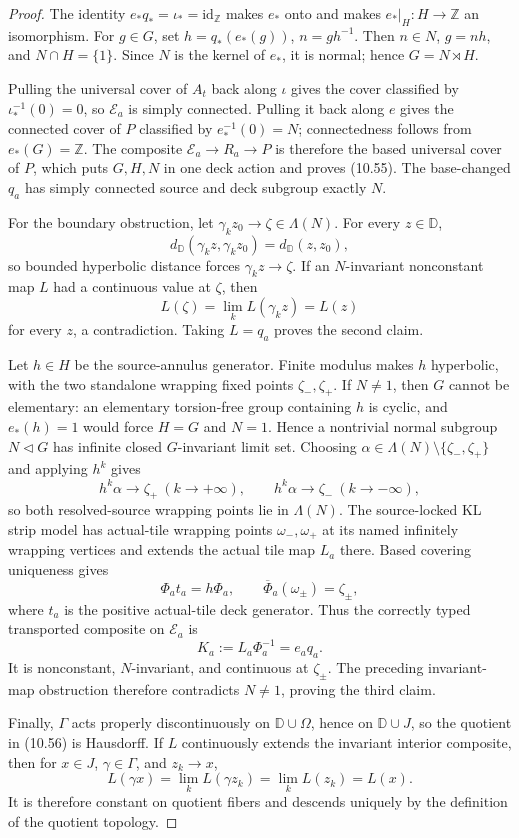 \begin{proof}
The identity \(e_*q_*=\iota_*=\mathrm{id}_{\mathbb Z}\) makes \(e_*\) onto and makes \(e_*|_H:H\to\mathbb Z\) an isomorphism. For \(g\in G\), set \(h=q_*(e_*(g))\), \(n=gh^{-1}\). Then \(n\in N\), \(g=nh\), and \(N\cap H=\{1\}\). Since \(N\) is the kernel of \(e_*\), it is normal; hence \(G=N\rtimes H\).

Pulling the universal cover of \(A_t\) back along \(\iota\) gives the cover classified by \(\iota_*^{-1}(0)=0\), so \(\mathcal E_a\) is simply connected. Pulling it back along \(e\) gives the connected cover of \(P\) classified by \(e_*^{-1}(0)=N\); connectedness follows from \(e_*(G)=\mathbb Z\). The composite \(\mathcal E_a\to R_a\to P\) is therefore the based universal cover of \(P\), which puts \(G,H,N\) in one deck action and proves (10.55). The base-changed \(q_a\) has simply connected source and deck subgroup exactly \(N\).

For the boundary obstruction, let \(\gamma_k z_0\to\zeta\in\Lambda(N)\). For every \(z\in\mathbb D\),
\[
d_{\mathbb D}(\gamma_k z,\gamma_k z_0)=d_{\mathbb D}(z,z_0),
\]
so bounded hyperbolic distance forces \(\gamma_k z\to\zeta\). If an \(N\)-invariant nonconstant map \(L\) had a continuous value at \(\zeta\), then
\[
L(\zeta)=\lim_k L(\gamma_k z)=L(z)
\]
for every \(z\), a contradiction. Taking \(L=q_a\) proves the second claim.

Let \(h\in H\) be the source-annulus generator. Finite modulus makes \(h\) hyperbolic, with the two standalone wrapping fixed points \(\zeta_-,\zeta_+\). If \(N\neq 1\), then \(G\) cannot be elementary: an elementary torsion-free group containing \(h\) is cyclic, and \(e_*(h)=1\) would force \(H=G\) and \(N=1\). Hence a nontrivial normal subgroup \(N\lhd G\) has infinite closed \(G\)-invariant limit set. Choosing \(\alpha\in\Lambda(N)\setminus\{\zeta_-,\zeta_+\}\) and applying \(h^{k}\) gives
\[
h^{k}\alpha\to\zeta_+\ (k\to+\infty),\qquad h^{k}\alpha\to\zeta_-\ (k\to-\infty),
\]
so both resolved-source wrapping points lie in \(\Lambda(N)\). The source-locked KL strip model has actual-tile wrapping points \(\omega_-,\omega_+\) at its named infinitely wrapping vertices and extends the actual tile map \(L_a\) there. Based covering uniqueness gives
\[
\Phi_a t_a=h\Phi_a,\qquad \overline{\Phi}_a(\omega_{\pm})=\zeta_{\pm},
\]
where \(t_a\) is the positive actual-tile deck generator. Thus the correctly typed transported composite on \(\mathcal E_a\) is
\[
K_a:=L_a\Phi_a^{-1}=e_aq_a .
\]
It is nonconstant, \(N\)-invariant, and continuous at \(\zeta_{\pm}\). The preceding invariant-map obstruction therefore contradicts \(N\neq 1\), proving the third claim.

Finally, \(\Gamma\) acts properly discontinuously on \(\mathbb D\cup\Omega\), hence on \(\mathbb D\cup J\), so the quotient in (10.56) is Hausdorff. If \(L\) continuously extends the invariant interior composite, then for \(x\in J\), \(\gamma\in\Gamma\), and \(z_k\to x\),
\[
L(\gamma x)=\lim_k L(\gamma z_k)=\lim_k L(z_k)=L(x).
\]
It is therefore constant on quotient fibers and descends uniquely by the definition of the quotient topology.
\end{proof}
